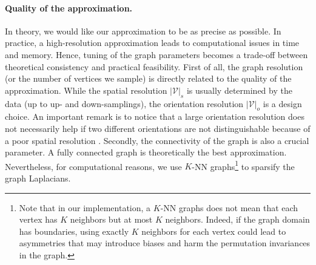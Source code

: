 \documentclass{article}
\begin{document}
\paragraph{Quality of the approximation.} In theory, we would like our approximation to be as precise as possible. In practice, a high-resolution approximation leads to computational issues in time and memory. Hence, tuning of the graph parameters becomes a trade-off between theoretical consistency and practical feasibility. First of all, the graph resolution (or the number of vertices we sample) is directly related to the quality of the approximation. While the spatial resolution $|\mathcal{V}|_s$ is usually determined by the data (up to up- and down-samplings), the orientation resolution $|\mathcal{V}|_o$ is a design choice. An important remark is to notice that a large orientation resolution does not necessarily help if two different orientations are not distinguishable because of a poor spatial resolution \citep{weiler_learning_2018,bekkers2019b}. %
Secondly, the connectivity of the graph is also a crucial parameter. A fully connected graph is theoretically the best approximation. Nevertheless, for computational reasons, we use $K$-NN graphs\footnote{Note that in our implementation, a $K$-NN graphs does not mean that each vertex has $K$ neighbors but at most $K$ neighbors. Indeed, if the graph domain has boundaries, using exactly $K$ neighbors for each vertex could lead to asymmetries that may introduce biases and harm the permutation invariances in the graph.} to sparsify the graph Laplacians.
\end{document}

